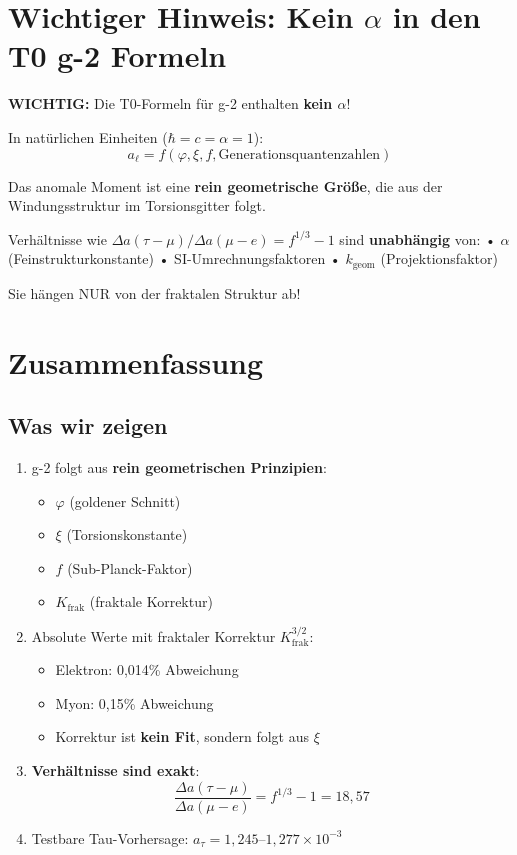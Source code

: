 	\section{Wichtiger Hinweis: Kein $\alpha$ in den T0 g-2 Formeln}
	
	\textbf{WICHTIG:}
	Die T0-Formeln für g-2 enthalten \textbf{kein $\alpha$}!
	
	In natürlichen Einheiten ($\hbar = c = \alpha = 1$):
	\[ a_\ell = f(\varphi, \xi, f, \text{Generationsquantenzahlen}) \]
	
	Das anomale Moment ist eine \textbf{rein geometrische Größe},
	die aus der Windungsstruktur im Torsionsgitter folgt.
	
	Verhältnisse wie $\Delta a(\tau-\mu)/\Delta a(\mu-e) = f^{1/3} - 1$ sind
	\textbf{unabhängig} von:
	• $\alpha$ (Feinstrukturkonstante)
	• SI-Umrechnungsfaktoren
	• $k_{\text{geom}}$ (Projektionsfaktor)
	
	Sie hängen NUR von der fraktalen Struktur ab!
	\section{Zusammenfassung}
	
	\subsection{Was wir zeigen}
	
	\begin{enumerate}
		\item g-2 folgt aus \textbf{rein geometrischen Prinzipien}:
		\begin{itemize}
			\item $\varphi$ (goldener Schnitt)
			\item $\xi$ (Torsionskonstante)
			\item $f$ (Sub-Planck-Faktor)
			\item $K_\text{frak}$ (fraktale Korrektur)
		\end{itemize}
		
		\item Absolute Werte mit fraktaler Korrektur $K_\text{frak}^{3/2}$:
		\begin{itemize}
			\item Elektron: 0{,}014\% Abweichung
			\item Myon: 0{,}15\% Abweichung
			\item Korrektur ist \textbf{kein Fit}, sondern folgt aus $\xi$
		\end{itemize}
		
		\item \textbf{Verhältnisse sind exakt}:
		\begin{equation}
			\frac{\Delta a(\tau - \mu)}{\Delta a(\mu - e)} = f^{1/3} - 1 = 18{,}57
		\end{equation}
		
		\item Testbare Tau-Vorhersage: $a_\tau = 1{,}245$--$1{,}277 \times 10^{-3}$
	\end{enumerate}
	
